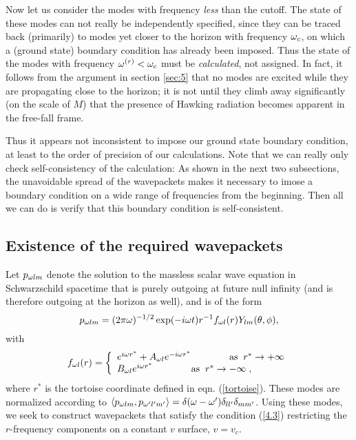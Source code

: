 Now let us consider the modes with frequency {\it less} than
the cutoff. The state of these modes can not really be
independently specified, since they can be traced back
(primarily) to modes yet closer to the horizon with
frequency $\omega_c$, on which a (ground state) boundary
condition has already been imposed. Thus the state of the
modes with frequency $\omega^{(r)}<\omega_c$ must be {\it calculated},
not assigned. In fact, it follows from the argument in
section \ref{sec:5} that no modes are excited while they are
propagating close to the horizon; it is not until they climb
away significantly (on the scale of $M$) that the presence
of Hawking radiation becomes apparent in the free-fall
frame.

Thus it appears not inconsistent to impose our
ground state boundary condition, at least to the order of precision
of our calculations. Note that we can really only check
self-consistency of the calculation: As shown in the next
two subsections, the unavoidable spread of the wavepackets
makes it necessary to imose a boundary condition on a wide
range of frequencies from the beginning. Then all we can do
is verify that this boundary condition is self-consistent.

\subsection{Existence of the required wavepackets}
\label{subsec:existence}

Let $p_{\omega lm}$ denote the solution to the massless scalar
wave equation in Schwarzschild spacetime
that is purely outgoing at future null infinity
(and is therefore outgoing at the horizon as well), and is of
the form
\begin{equation}
p_{\omega lm}=(2\pi\omega)^{-1/2}
\exp(-i\omega t) r^{-1}f_{\omega l}(r)
Y_{lm}(\theta,\phi),
\end{equation}
with
\begin{equation}
f_{\omega l}(r)=\left\{
\begin{array}{l}
e^{i\omega r^*}+A_{\omega l}e^{-i\omega r^*}\qquad\qquad
{\rm as}\; \;  r^*\rightarrow +\infty\\
B_{\omega l}e^{i\omega r^*}\qquad\qquad {\rm as}\; \;
r^*\rightarrow -\infty\; ,
\end{array}\right.
\end{equation}
where $r^*$ is the tortoise coordinate defined in eqn.
(\ref{tortoise}). These modes are normalized according to
$\langle p_{\omega lm},p_{\omega' l'm'}\rangle =
\delta(\omega-\omega')\delta_{ll'}\delta_{mm'}$.
Using these modes, we seek to construct wavepackets that
satisfy the condition (\ref{4.3}) restricting the $r$-frequency
components on a constant $v$ surface, $v=v_c$.

